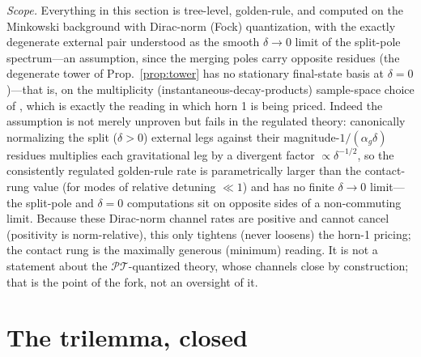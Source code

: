 \documentclass[11pt]{article}
\theoremstyle{definition}
\theoremstyle{remark}
\newcommand{\PT}{\mathcal{PT}}
\newcommand{\ag}{\alpha_g}
\begin{document}
\emph{Scope.} Everything in this section is tree-level, golden-rule,
and computed on the Minkowski background with Dirac-norm (Fock)
quantization, with the exactly degenerate external pair understood as
the smooth $\delta\to0$ limit of the split-pole spectrum---an assumption,
since the merging poles carry opposite residues (the
degenerate tower of Prop.~\ref{prop:tower} has no stationary
final-state basis at $\delta=0$)---that is, on the multiplicity (instantaneous-decay-products) sample-space choice of
\cite{instantaneous}, which is exactly the reading in which horn 1 is
being priced. Indeed the assumption is not merely unproven but fails in
the regulated theory: canonically normalizing the split ($\delta>0$)
external legs against their magnitude-$1/(\ag\delta)$ residues multiplies
each gravitational leg by a divergent factor $\propto\delta^{-1/2}$, so
the consistently regulated golden-rule rate is parametrically larger than the
contact-rung value (for modes of relative detuning $\ll1$) and has no finite $\delta\to0$ limit---the split-pole
and $\delta=0$ computations sit on opposite sides of a non-commuting
limit. Because these Dirac-norm channel rates are positive and cannot
cancel (positivity is norm-relative), this only tightens (never loosens) the horn-1 pricing; the contact rung is
the maximally generous (minimum) reading. It is not a statement about the $\PT$-quantized
theory, whose channels close by construction; that is the point of
the fork, not an oversight of it.

\section{The trilemma, closed}
\label{sec:trilemma}
\end{document}
